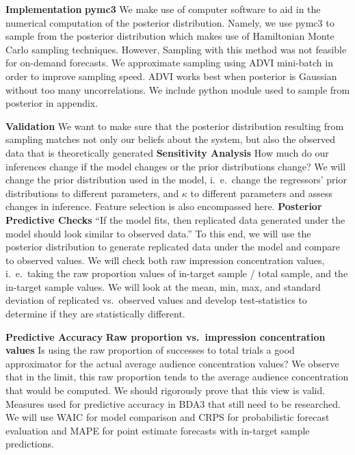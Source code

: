 \documentclass{article}
\begin{document}
\begin{outline}[enumerate]
       \2 \textbf{Implementation}
           \3 \textbf{pymc3}
               We make use of computer software to aid in the numerical computation of the posterior distribution.
               Namely, we use pymc3 to sample from the posterior distribution which makes use of Hamiltonian Monte Carlo sampling techniques.
               However, Sampling with this method was not feasible for on-demand forecasts.
               \4 We approximate sampling using ADVI mini-batch in order to improve sampling speed.
                   ADVI works best when posterior is Gaussian without too many uncorrelations.
                   We include python module used to sample from posterior in appendix.

       \2 \textbf{Validation}
           We want to make sure that the posterior distribution resulting from sampling matches not only our
           beliefs about the system, but also the observed data that is theoretically generated
           \3 \textbf{Sensitivity Analysis}
               How much do our inferences change if the model changes or the prior distributions change?
               We will change the prior distribution used in the model, i.\ e.\  change the regressors' prior distributions to different
               parameters, and $\kappa$ to different parameters and assess changes in inference. Feature selection is also encompassed here.
           \3 \textbf{Posterior Predictive Checks}
               ``If the model fits, then replicated data generated under the model should look similar to observed data.''
               To this end, we will use the posterior distribution to generate replicated data under the model and compare to observed values.
               We will check both raw impression concentration values, i.\ e.\  taking the raw proportion values of in-target sample / total sample, and
               the in-target sample values.
               We will look at the mean, min, max, and standard deviation of replicated vs.\ observed values
               and develop test-statistics to determine if they are statistically different.

       \2 \textbf{Predictive Accuracy}
           \3 \textbf{Raw proportion vs.\ impression concentration values}
               Is using the raw proportion of successes to total trials a good approximator for the actual average audience concentration values?
               We observe that in the limit, this raw proportion tends to the average audience concentration that would be computed. We should
               rigorously prove that this view is valid.
           \3 Measures used for predictive accuracy in BDA3 that still need to be researched.
               We will use WAIC for model comparison and CRPS for probabilistic forecast evaluation and MAPE for
               point estimate forecasts with in-target sample predictions.


\end{outline}
\end{document}
